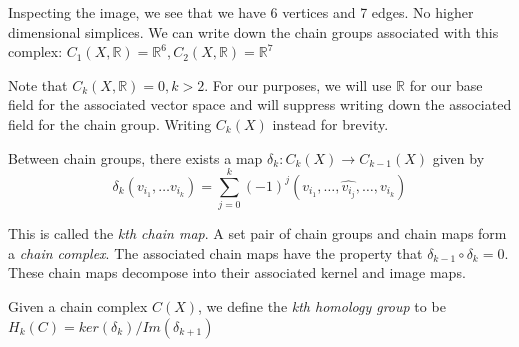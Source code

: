 \documentclass[12pt]{article}
\begin{document}
Inspecting the image, we see that we have 6 vertices and 7 edges. No higher dimensional simplices. 
We can write down the chain groups associated with this complex: $C_1(X, \mathbb{R}) = \mathbb{R}^6 , C_2(X, \mathbb{R}) = \mathbb{R}^7$


Note that $C_k(X, \mathbb{R}) = 0, k > 2$. For our purposes, we will use $\mathbb{R}$ for our base field for the 
associated vector space and will suppress writing down the associated field for the chain group. Writing 
$C_k(X)$ instead for brevity.

Between chain groups, there exists a map $\delta_{k}: C_k(X) \to C_{k-1}(X)$ given by
\begin{equation}
  \delta_k (v_{i_1}, \ldots v_{i_k}) =  \sum_{j = 0}^{k} (-1)^j (v_{i_1}, \ldots, \hat{v_{i_j}} , \ldots, v_{i_k})
\end{equation}

This is called the \textit{kth chain map}. A set pair of chain groups and chain maps form a \textit{chain complex}.
The associated chain maps have the property that $\delta_{k-1} \circ \delta_{k} = 0$. These chain maps decompose 
into their associated kernel and image maps.

Given a chain complex $C(X)$, we define the \textit{kth homology group} to be $H_k(C) = ker(\delta_k) / Im(\delta_{k+1})$
\end{document}
